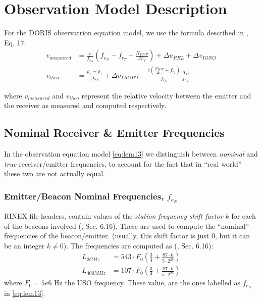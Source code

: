 \section{Observation Model Description}
\label{sec:doris-introduction}

For the DORIS observatrion equation model, we use the formula described in 
\cite{lemoine-2016}, Eq. 17:
\begin{subequations} \label{eq:lem13}
    \begin{align}
        v_{measured} & = \frac{c}{f_{e_N}} (f_{e_N} - f_{r_T} -
          \frac{N_{DOP}}{\Delta\tau_r}) + \Delta u_{REL} + 
          \Delta v_{IONO} \label{eq:lem13a} \\
        v_{theo} &= \frac{\rho_2 - \rho_1}{\Delta\tau_r} +
          \Delta v_{TROPO} - \frac{c(\frac{N_{DOP}}{\Delta\tau_r} + 
          f_{r_T})}{f_{e_N}} \frac{\Delta f_e}{f_{e_N}} \label{eq:lem13b}
    \end{align}
\end{subequations}

where $v_{measured}$ and $v_{theo}$ represent the relative velocity between  
the emitter and the receiver as measured and computed respectively.

\subsection{Nominal Receiver \& Emitter Frequencies}
\label{ssec:nominal-frequencies}
In the observation equation model \ref{eq:lem13} we distinguish between 
\emph{nominal} and \emph{true} receiver/emitter frequencies, to account for 
the fact that in ``real world'' these two are not actually equal.

\subsubsection{Emitter/Beacon Nominal Frequencies, $f_{e_N}$}
\label{sssec:beacon-nominal-frequencies}

RINEX file headers, contain values of the \emph{station frequency shift 
factor} $k$ for each of the beacons involved (\cite{DORISRNX3}, Sec. 6.16). 
These are used to compute the ``nominal'' frequencies of the beacon/emitter. 
(usually, this shift factor is just $0$, but it can be an integer 
$k \neq 0$). The frequencies are computed as (\cite{DORISRNX3}, Sec. 6.16):
\begin{equation}
  \begin{aligned}
    L_{2GHz}   &= 543 \cdot F_0 \left( \frac{3}{4} + \frac{87\cdot k}{5 \cdot 2^{26}} \right) \\
    L_{400MHz} &= 107 \cdot F_0 \left( \frac{3}{4} + \frac{87\cdot k}{5 \cdot 2^{26}} \right) 
    \label{eq:nominal-freq}
  \end{aligned}
\end{equation}
where $F_0 = 5e6 \text{ Hz}$ the USO frequency. These value, are the ones 
labelled as $f_{e_N}$ in \ref{eq:lem13}.

